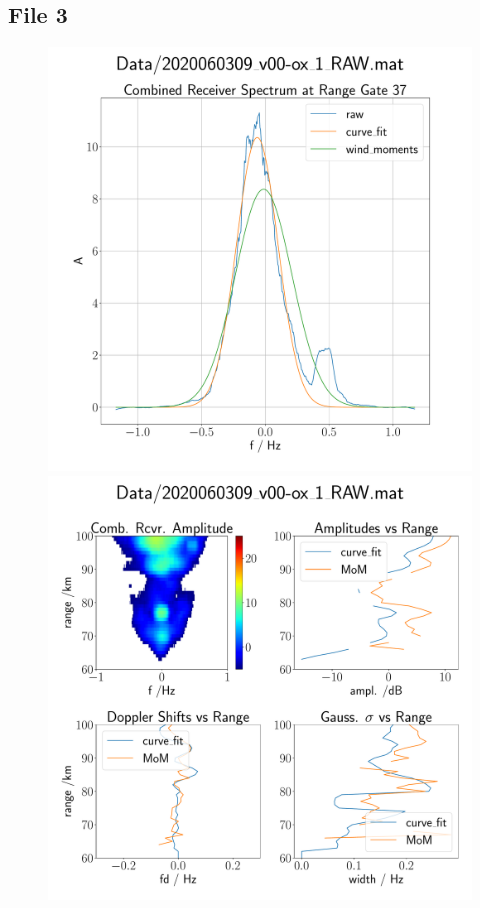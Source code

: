 \subsection{File 3}
\begin{figure}[H]
  \begin{minipage}[t]{0.45\textwidth}
    \centering
    \includegraphics[width=\textwidth]{graphics/data_2_single_rg.pdf}
    \caption{}
  \end{minipage}\hfill
  \begin{minipage}[t]{0.45\textwidth}
    \centering
    \includegraphics[width=\textwidth]{graphics/data_2_quad.pdf}
    \caption{}
   \end{minipage}
\end{figure}


